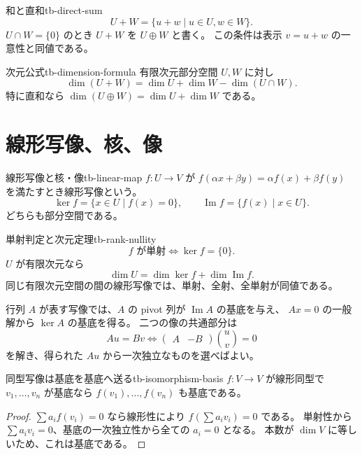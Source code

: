 \begin{definition}{和と直和}{tb-direct-sum}
\[
U+W=\{u+w\mid u\in U,w\in W\}.
\]
$U\cap W=\{0\}$ のとき $U+W$ を $U\oplus W$ と書く。
この条件は表示 $v=u+w$ の一意性と同値である。
\end{definition}

\begin{theorem}{次元公式}{tb-dimension-formula}
有限次元部分空間 $U,W$ に対し
\[
\dim(U+W)=\dim U+\dim W-\dim(U\cap W).
\]
特に直和なら $\dim(U\oplus W)=\dim U+\dim W$ である。
\end{theorem}

\section{線形写像、核、像}

\begin{definition}{線形写像と核・像}{tb-linear-map}
$f:U\to V$ が
$f(\alpha x+\beta y)=\alpha f(x)+\beta f(y)$ を満たすとき線形写像という。
\[
\ker f=\{x\in U\mid f(x)=0\},\qquad
\operatorname{Im}f=\{f(x)\mid x\in U\}.
\]
どちらも部分空間である。
\end{definition}

\begin{theorem}{単射判定と次元定理}{tb-rank-nullity}
\[
f\text{ が単射}\Longleftrightarrow\ker f=\{0\}.
\]
$U$ が有限次元なら
\[
\dim U=\dim\ker f+\dim\operatorname{Im}f.
\]
同じ有限次元空間の間の線形写像では、単射、全射、全単射が同値である。
\end{theorem}

行列 $A$ が表す写像では、$A$ の pivot 列が $\operatorname{Im}A$ の基底を与え、
$Ax=0$ の一般解から $\ker A$ の基底を得る。
二つの像の共通部分は
\[
Au=Bv\Longleftrightarrow
\begin{pmatrix}A&-B\end{pmatrix}
\binom uv=0
\]
を解き、得られた $Au$ から一次独立なものを選べばよい。

\begin{proposition}{同型写像は基底を基底へ送る}{tb-isomorphism-basis}
$f:V\to V$ が線形同型で $v_1,\ldots,v_n$ が基底なら
$f(v_1),\ldots,f(v_n)$ も基底である。
\end{proposition}

\begin{proof}
$\sum a_if(v_i)=0$ なら線形性により $f(\sum a_iv_i)=0$ である。
単射性から $\sum a_iv_i=0$、基底の一次独立性から全ての $a_i=0$ となる。
本数が $\dim V$ に等しいため、これは基底である。
\end{proof}

